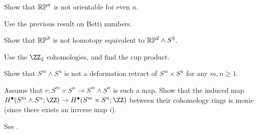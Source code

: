 \begin{problem}
	Show that $\mathbb{RP}^n$ is not orientable for even $n$.
	\begin{hint}
		Use the previous result on Betti numbers.
	\end{hint}
\end{problem}

\begin{problem}
	Show that $\mathbb{RP}^3$ is not homotopy equivalent to $\mathbb{RP}^2 \wedge S^3$.
	\begin{hint}
		Use the $\Zc2$ cohomologies, and find the cup product.
	\end{hint}
\end{problem}

\begin{problem}
	\gim
	Show that $S^m \wedge S^n$ is not a deformation retract
	of $S^m \times S^n$ for any $m,n \ge 1$.
	\begin{hint}
		Assume that $r : S^m \times S^n \to S^m \wedge S^n$ is such a map.
		Show that the induced map
		$H^\bullet(S^m \wedge S^n; \ZZ) \to H^\bullet(S^m \times S^n; \ZZ)$
		between their cohomology rings is monic
		(since there exists an inverse map $i$).
	\end{hint}
	\begin{sol}
		See \cite[Example 3.3.14, pages 68-69]{ref:maxim752}.
	\end{sol}
\end{problem}

